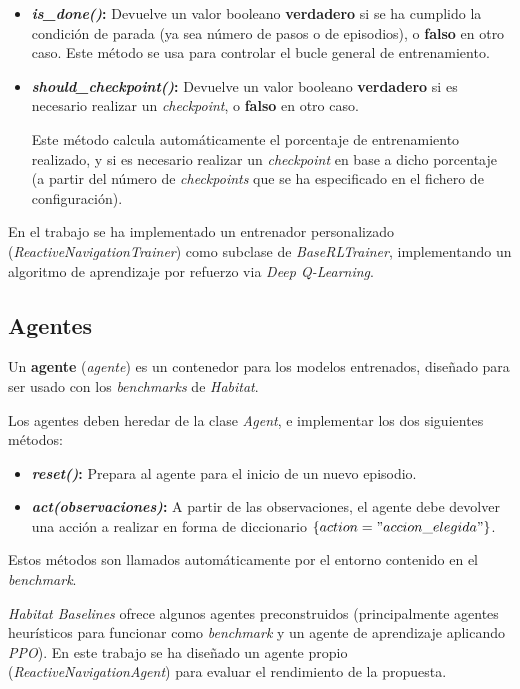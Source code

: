 \begin{itemize}
	\item \textbf{\textit{is{\_}done()}:} Devuelve un valor booleano \textbf{verdadero} si se ha cumplido la condición de parada (ya sea número de pasos o de episodios), o \textbf{falso} en otro caso. Este método se usa para controlar el bucle general de entrenamiento.
	\item \textbf{\textit{should{\_}checkpoint()}:} Devuelve un valor booleano \textbf{verdadero} si es necesario realizar un \textit{checkpoint}, o \textbf{falso} en otro caso.
	
	Este método calcula automáticamente el porcentaje de entrenamiento realizado, y si es necesario realizar un \textit{checkpoint} en base a dicho porcentaje (a partir del número de \textit{checkpoints} que se ha especificado en el fichero de configuración).
\end{itemize}

En el trabajo se ha implementado un entrenador personalizado (\textit{ReactiveNavigationTrainer}) como subclase de \textit{BaseRLTrainer}, implementando un algoritmo de aprendizaje por refuerzo via \textit{Deep Q-Learning}.

\subsection{Agentes}

Un \textbf{agente} (\textit{agente}) es un contenedor para los modelos entrenados, diseñado para ser usado con los \textit{benchmarks} de \textit{Habitat}.

Los agentes deben heredar de la clase \textit{Agent}, e implementar los dos siguientes métodos:

\begin{itemize}
	\item \textbf{\textit{reset()}:} Prepara al agente para el inicio de un nuevo episodio.
	\item \textbf{\textit{act(observaciones)}:} A partir de las observaciones, el agente debe devolver una acción a realizar en forma de diccionario $\{action="accion\_elegida"\}$.
\end{itemize}

Estos métodos son llamados automáticamente por el entorno contenido en el \textit{benchmark}.

\textit{Habitat Baselines} ofrece algunos agentes preconstruidos (principalmente agentes heurísticos para funcionar como \textit{benchmark} y un agente de aprendizaje aplicando \textit{PPO}). En este trabajo se ha diseñado un agente propio (\textit{ReactiveNavigationAgent}) para evaluar el rendimiento de la propuesta.

